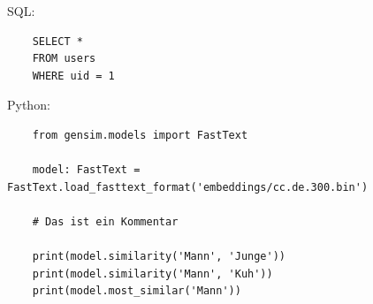 \documentclass[chapterprefix=false, 12pt, a4paper, oneside, parskip=half, listof=totoc, bibliography=totoc, numbers=noendperiod]{scrbook}
\begin{document}
    SQL:

    \begin{verbatim}
    SELECT *
    FROM users
    WHERE uid = 1
    \end{verbatim}

    Python:

    \begin{verbatim}
    from gensim.models import FastText

    model: FastText = FastText.load_fasttext_format('embeddings/cc.de.300.bin')

    # Das ist ein Kommentar

    print(model.similarity('Mann', 'Junge'))
    print(model.similarity('Mann', 'Kuh'))
    print(model.most_similar('Mann'))
    \end{verbatim}
\end{document}
